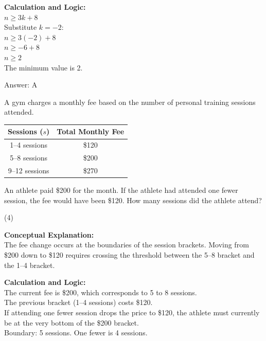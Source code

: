 \documentclass[11pt,paper=a4,answers]{exam}
\begin{document}
\begin{questions}
\begin{solution}
\vspace{10pt}
\textbf{Calculation and Logic:} \\
$n \ge 3k + 8$ \\
Substitute $k = -2$: \\
$n \ge 3(-2) + 8$ \\
$n \ge -6 + 8$ \\
$n \ge 2$ \\
The minimum value is 2.

\vspace{15pt}
Answer: \colorbox{yellow!100}{A}
\end{solution}




\question
A gym charges a monthly fee based on the number of personal training sessions attended.
\begin{center}
\begin{tabular}{|c|c|}
\hline
\textbf{Sessions ($s$)} & \textbf{Total Monthly Fee} \\ \hline
1--4 sessions & \$120 \\ \hline
5--8 sessions & \$200 \\ \hline
9--12 sessions & \$270 \\ \hline
\end{tabular}
\end{center}
An athlete paid \$200 for the month. If the athlete had attended one fewer session, the fee would have been \$120. How many sessions did the athlete attend?
\begin{tasks}(4)
\end{tasks}

\begin{solution}
\textbf{Conceptual Explanation:} \\
The fee change occurs at the boundaries of the session brackets. Moving from \$200 down to \$120 requires crossing the threshold between the 5--8 bracket and the 1--4 bracket.

\vspace{10pt}
\textbf{Calculation and Logic:} \\
The current fee is \$200, which corresponds to 5 to 8 sessions. \\
The previous bracket (1--4 sessions) costs \$120. \\
If attending one fewer session drops the price to \$120, the athlete must currently be at the very bottom of the \$200 bracket. \\
Boundary: 5 sessions. One fewer is 4 sessions.


\end{solution}
\end{questions}
\end{document}

